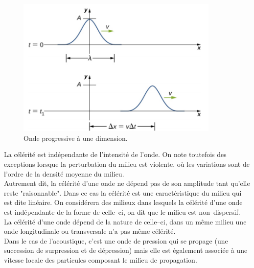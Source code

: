 
\begin{figure}[h]
    \centering
    \includegraphics[width=10cm]{onde.png}
    \caption{Onde progressive à une dimension.~\cite{image-onde-progressive}}
\end{figure}

\newpage

La célérité est indépendante de l'intensité 
de l'onde. On note toutefois des exceptions lorsque la perturbation 
du milieu est violente, où les variations sont de l'ordre de la densité 
moyenne du milieu.~\cite{pastur-onde}\\

Autrement dit, la célérité d’une onde ne dépend pas de son amplitude 
tant qu’elle reste "raisonnable".
Dans ce cas la célérité 
est une caractéristique du milieu qui est dite linéaire.
On considérera des milieux dans lesquels la célérité d’une onde 
est indépendante de la forme de celle–ci, on dit que le milieu est
non–dispersif.\\
La célérité d’une onde dépend de la nature de celle–ci, 
dans un même milieu une onde longitudinale ou transversale n’a pas même
célérité. \\
Dans le cas de l’acoustique, c’est une onde de pression qui se propage 
(une succession de surpression et de dépression) mais elle est également 
associée à une vitesse locale des particules composant le milieu de 
propagation.

